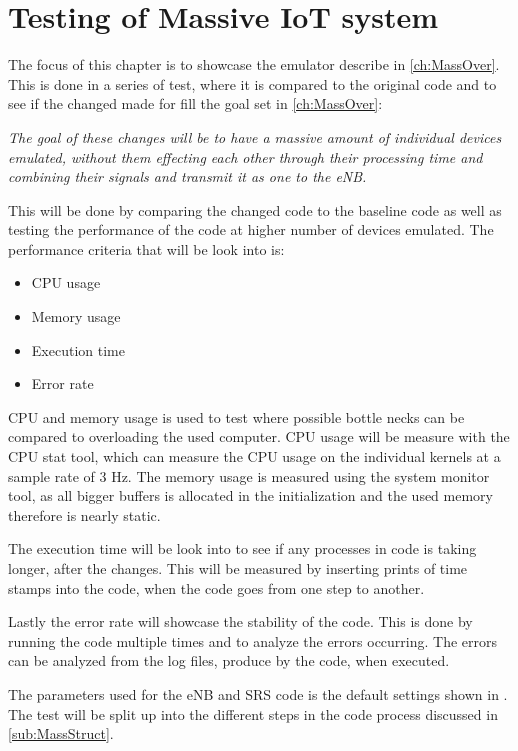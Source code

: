 \chapter{Testing of Massive IoT system} \label{ch:mass_test}
The focus of this chapter is to showcase the emulator describe in \autoref{ch:MassOver}. This is done in a series of test, where it is compared to the original code and to see if the changed made for fill the goal set in \autoref{ch:MassOver}:

\textit{The goal of these changes will be to have a massive amount of individual devices emulated, without them effecting each other through their processing time and combining their signals and transmit it as one to the eNB.}

This will be done by comparing the changed code to the baseline code as well as testing the performance of the code at higher number of devices emulated.
The performance criteria that will be look into is:

\begin{itemize}
\item CPU usage
\item Memory usage
\item Execution time
\item Error rate
\end{itemize}

CPU and memory usage is used to test where possible bottle necks can be compared to overloading the used computer. CPU usage will be measure with the CPU stat tool, which can measure the CPU usage on the individual kernels at a sample rate of 3 Hz. The memory usage is measured using the system monitor tool, as all bigger buffers is allocated in the initialization and the used memory therefore is nearly static. 

The execution time will be look into to see if any processes in code is taking longer, after the changes. This will be measured by inserting prints of time stamps into the code, when the code goes from one step to another. 

Lastly the error rate will showcase the stability of the code. This is done by running the code multiple times and to analyze the errors occurring. The errors can be analyzed from the log files, produce by the code, when executed.

The parameters used for the eNB and SRS code is the default settings shown in . The test will be split up into the different steps in the code process discussed in \autoref{sub:MassStruct}.


